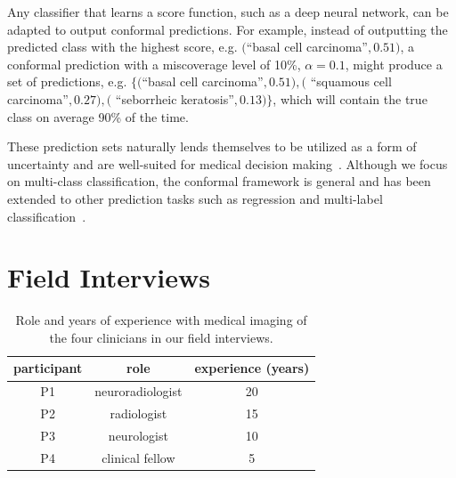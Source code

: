 \documentclass[letterpaper]{article} %
\begin{document}

        Any classifier that learns a score function, such as a deep neural network, can be adapted to output conformal predictions.
        For example, instead of outputting the predicted class with the highest score, e.g. $($``basal cell carcinoma''$, 0.51)$, a conformal prediction with a miscoverage level of 10\%, $\alpha=0.1$, might produce a set of predictions, e.g. $\{($``basal cell carcinoma''$, 0.51), ($ ``squamous cell carcinoma''$, 0.27), ($ ``seborrheic keratosis''$, 0.13)\}$, which will contain the true class on average 90\% of the time.

        These prediction sets naturally lends themselves to be utilized as a form of uncertainty and are well-suited for medical decision making~\cite{kompa,10.1007/s41666-021-00113-8}.
        Although we focus on multi-class classification, the conformal framework is general and has been extended to other prediction tasks such as regression and multi-label classification~\cite{NEURIPS2019_5103c358,JMLR:v22:20-753}.


\section{Field Interviews}
    \begin{table}[t]
    \small
    \centering
    \begin{tabular}{ccc}
        \toprule
        \textbf{participant} & \textbf{role} & \textbf{experience (years)} \\
        \midrule
        P1 & neuroradiologist & 20 \\
        P2 & radiologist & 15 \\
        P3 & neurologist & 10 \\
        P4 & clinical fellow & 5 \\
        \bottomrule
    \end{tabular}
    \caption{Role and years of experience with medical imaging of the four clinicians in our field interviews.}
    \label{tab:field}
    \end{table}
\end{document}
